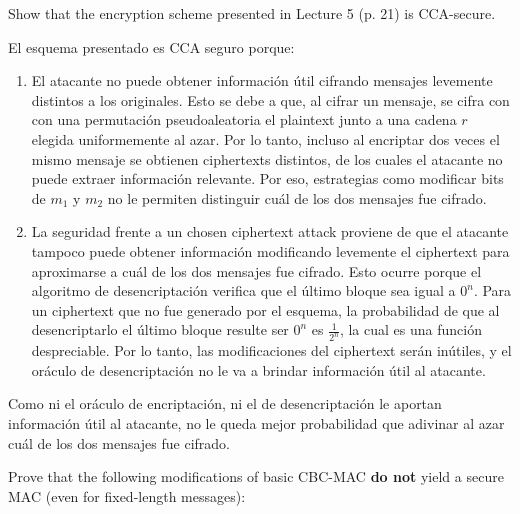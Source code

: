 \documentclass[12pt,addpoints,answers]{exam}
\begin{document}
\begin{questions}
\question[10] Show that the encryption scheme presented in Lecture 5 (p. 21) is CCA-secure.
\begin{solution}
    El esquema presentado es CCA seguro porque:
    \begin{enumerate}
        \item El atacante no puede obtener información útil cifrando mensajes levemente distintos a los originales. Esto se debe a que, al cifrar un mensaje, se cifra con con una permutación pseudoaleatoria el plaintext junto a una cadena $r$ elegida uniformemente al azar. Por lo tanto, incluso al encriptar dos veces el mismo mensaje se obtienen ciphertexts distintos, de los cuales el atacante no puede extraer información relevante. Por eso, estrategias como modificar bits de $m_1$ y $m_2$ no le permiten distinguir cuál de los dos mensajes fue cifrado. 
    
        \item La seguridad frente a un chosen ciphertext attack proviene de que el atacante tampoco puede obtener información modificando levemente el ciphertext para aproximarse a cuál de los dos mensajes fue cifrado. Esto ocurre porque el algoritmo de desencriptación verifica que el último bloque sea igual a $0^n$. Para un ciphertext que no fue generado por el esquema, la probabilidad de que al desencriptarlo el último bloque resulte ser $0^n$ es $\frac{1}{2^n}$, la cual es una función despreciable. Por lo tanto, las modificaciones del ciphertext serán inútiles, y el oráculo de desencriptación no le va a brindar información útil al atacante.
    \end{enumerate}
    Como ni el oráculo de encriptación, ni el de desencriptación le aportan información útil al atacante, no le queda mejor probabilidad que adivinar al azar cuál de los dos mensajes fue cifrado. 
\end{solution}


\question Prove that the following modifications of basic CBC-MAC {\bf do not} yield a secure MAC (even for fixed-length messages):
\begin{parts}

\end{parts}
\end{questions}
\end{document}
